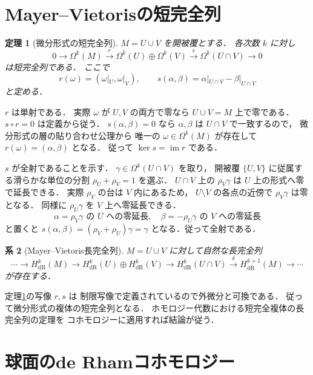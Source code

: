 \documentclass[a5paper,10pt,onecolumn]{jsarticle}
\makeatletter
\theoremstyle{mathnotetheorem}
\newtheorem{theorem}{定理}[section]
\newtheorem{corollary}[theorem]{系}
\renewcommand{\proofname}{証明}
\renewenvironment{proof}[1][\proofname]{%
  \par\pushQED{\qed}\normalfont\topsep4\p@\@plus2\p@\relax
  \trivlist\item[\hskip\labelsep\bfseries #1]\ignorespaces
}{\popQED\endtrivlist\@endpefalse}
\makeatother
\begin{document}
\section{Mayer--Vietorisの短完全列}

\begin{theorem}[微分形式の短完全列]\label{thm:mv-short}
$M=U\cup V$ を開被覆とする．
各次数 $k$ に対し
\[
 0\to\Omega^k(M)
 \xrightarrow{r}\Omega^k(U)\oplus\Omega^k(V)
 \xrightarrow{s}\Omega^k(U\cap V)\to0
\]
は短完全列である．
ここで
\[
 r(\omega)=(\omega|_U,\omega|_V),\qquad
 s(\alpha,\beta)=\alpha|_{U\cap V}-\beta|_{U\cap V}
\]
と定める．
\end{theorem}
\begin{proof}
$r$ は単射である．
実際 $\omega$ が $U,V$ の両方で零なら
$U\cup V=M$ 上で零である．
$s\circ r=0$ は定義から従う．
$s(\alpha,\beta)=0$ なら
$\alpha,\beta$ は $U\cap V$ で一致するので，
微分形式の層の貼り合わせ公理から
唯一の $\omega\in\Omega^k(M)$ が存在して
$r(\omega)=(\alpha,\beta)$ となる．
従って $\ker s=\operatorname{im}r$ である．

$s$ が全射であることを示す．
$\gamma\in\Omega^k(U\cap V)$ を取り，
開被覆 $\{U,V\}$ に従属する滑らかな単位の分割
$\rho_U+\rho_V=1$ を選ぶ．
$U\cap V$ 上の
$\rho_V\gamma$ は $U$ 上の形式へ零で延長できる．
実際 $\rho_V$ の台は $V$ 内にあるため，
$U\setminus V$ の各点の近傍で
$\rho_V\gamma$ は零となる．
同様に $\rho_U\gamma$ を $V$ 上へ零延長できる．
\[
 \alpha=\rho_V\gamma\text{ の }U\text{ への零延長},\quad
 \beta=-\rho_U\gamma\text{ の }V\text{ への零延長}
\]
と置くと
$s(\alpha,\beta)=(\rho_V+\rho_U)\gamma=\gamma$
となる．従って全射である．
\end{proof}

\begin{corollary}[Mayer--Vietoris長完全列]\label{cor:mv}
$M=U\cup V$ に対して自然な長完全列
\[
 \cdots\to H_{\mathrm{dR}}^k(M)\to
 H_{\mathrm{dR}}^k(U)\oplus H_{\mathrm{dR}}^k(V)\to
 H_{\mathrm{dR}}^k(U\cap V)\xrightarrow{\delta}
 H_{\mathrm{dR}}^{k+1}(M)\to\cdots
\]
が存在する．
\end{corollary}
\begin{proof}
定理\ref{thm:mv-short}の写像 $r,s$ は
制限写像で定義されているので外微分と可換である．
従って微分形式の複体の短完全列となる．
ホモロジー代数における短完全複体の長完全列の定理を
コホモロジーに適用すれば結論が従う．
\end{proof}

\section{球面のde Rhamコホモロジー}
\end{document}
